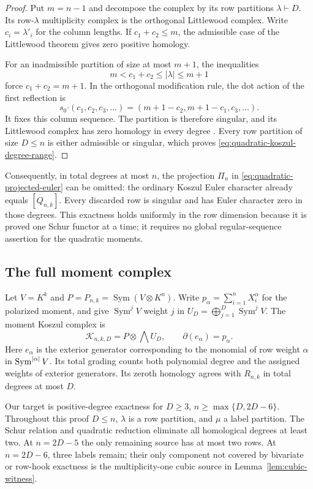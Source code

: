 \begin{proof}
Put $m=n-1$ and decompose the complex by its row partitions
$\lambda\vdash D$.  Its row-$\lambda$ multiplicity complex is
the orthogonal Littlewood complex.  Write
$c_i=\lambda'_i$ for the column lengths.  If
$c_1+c_2\le m$, the admissible case of the Littlewood theorem
gives zero positive homology.

For an inadmissible partition of size at most $m+1$, the inequalities
\[
          m<c_1+c_2\le |\lambda|\le m+1
\]
force $c_1+c_2=m+1$.  In the orthogonal modification rule,
the dot action of the first reflection is
\[
 s_0\mathbin{\boldsymbol\cdot}(c_1,c_2,c_3,\ldots)
       =(m+1-c_2,m+1-c_1,c_3,\ldots).
\]
It fixes this column sequence.  The partition is therefore singular,
and its Littlewood complex has zero homology in every degree
\cite[\S4.4 and Theorem~4.4]{SSW2013}.
Every row partition of size $D\le n$ is either admissible or singular,
which proves \eqref{eq:quadratic-koszul-degree-range}.
\end{proof}

Consequently, in total degrees at most $n$, the projection $\Pi_n$
in \eqref{eq:quadratic-projected-euler} can be omitted: the ordinary
Koszul Euler character already equals $[Q_{n,k}]$.  Every discarded
row is singular and has Euler character zero in those degrees.
This exactness holds uniformly in the row dimension because it is
proved one Schur functor at a time; it requires no global
regular-sequence assertion for the quadratic moments.


\subsection{The full moment complex}
\label{sec:explicit-stable-characters}

Let $V=K^k$ and $P=P_{n,k}=\operatorname{Sym}(V\otimes K^n)$.
Write $p_\alpha=\sum_{i=1}^nX_i^\alpha$ for the polarized moment,
and give
$\operatorname{Sym}^j V$ weight $j$ in
$U_D=\bigoplus_{j=1}^D\operatorname{Sym}^j V$.
The moment Koszul complex is
\[
 \mathcal K_{n,k,D}=P\otimes\bigwedge U_D,
 \qquad \partial(e_\alpha)=p_\alpha.
\]
Here $e_\alpha$ is the exterior generator corresponding to the
monomial of row weight $\alpha$ in $\operatorname{Sym}^{|\alpha|}V$.
Its total grading counts both polynomial degree and the assigned
weights of exterior generators. Its zeroth homology agrees with
$R_{n,k}$ in total degrees at most $D$.

Our target is positive-degree exactness for
$D\ge3$, $n\ge\max\{D,2D-6\}$. Throughout this proof $D\le n$,
$\lambda$ is a row partition, and $\mu$ a label partition.
The Schur relation and quadratic reduction eliminate all homological
degrees at least two. At $n=2D-5$ the only remaining source has at
most two rows. At $n=2D-6$, three labels remain; their only component
not covered by bivariate or row-hook exactness is the multiplicity-one
cubic source in Lemma~\ref{lem:cubic-witness}.

